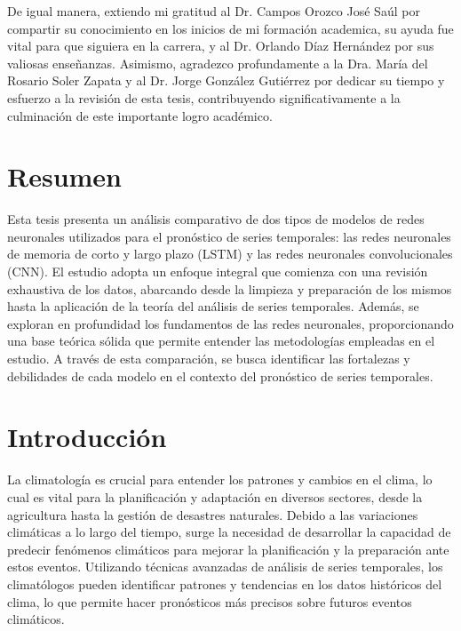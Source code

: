 \documentclass[
  us-letterpaper,
]{scrreprt}
\renewcommand*\contentsname{Tabla de contenidos}
\newcommand\contentsname{Tabla de contenidos}
\theoremstyle{plain}
\theoremstyle{definition}
\theoremstyle{definition}
\theoremstyle{remark}
\begin{document}
De igual manera, extiendo mi gratitud al Dr. Campos Orozco José Saúl por compartir su conocimiento en los inicios de mi formación academica, su ayuda fue vital para que siguiera en la carrera, y al Dr. Orlando Díaz Hernández por sus valiosas enseñanzas. Asimismo, agradezco profundamente a la Dra. María del Rosario Soler Zapata y al Dr. Jorge González Gutiérrez por dedicar su tiempo y esfuerzo a la revisión de esta tesis, contribuyendo significativamente a la culminación de este importante logro académico.
\renewcommand*\contentsname{Tabla de contenidos}
{
\hypersetup{linkcolor=}
\setcounter{tocdepth}{2}
\tableofcontents
}


\chapter{Resumen}\label{resumen}

Esta tesis presenta un análisis comparativo de dos tipos de modelos de
redes neuronales utilizados para el pronóstico de series temporales: las
redes neuronales de memoria de corto y largo plazo (LSTM) y las redes
neuronales convolucionales (CNN). El estudio adopta un enfoque integral
que comienza con una revisión exhaustiva de los datos, abarcando desde
la limpieza y preparación de los mismos hasta la aplicación de la teoría
del análisis de series temporales. Además, se exploran en profundidad
los fundamentos de las redes neuronales, proporcionando una base teórica
sólida que permite entender las metodologías empleadas en el estudio. A
través de esta comparación, se busca identificar las fortalezas y
debilidades de cada modelo en el contexto del pronóstico de series
temporales.


\chapter*{Introducción}\label{introducciuxf3n}


La climatología es crucial para entender los patrones y cambios en el
clima, lo cual es vital para la planificación y adaptación en diversos
sectores, desde la agricultura hasta la gestión de desastres naturales.
Debido a las variaciones climáticas a lo largo del tiempo, surge la
necesidad de desarrollar la capacidad de predecir fenómenos climáticos
para mejorar la planificación y la preparación ante estos eventos.
Utilizando técnicas avanzadas de análisis de series temporales, los
climatólogos pueden identificar patrones y tendencias en los datos
históricos del clima, lo que permite hacer pronósticos más precisos
sobre futuros eventos climáticos.
\end{document}
